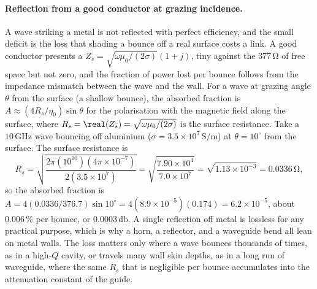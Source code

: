\paragraph{Reflection from a good conductor at grazing incidence.}
A wave striking a metal is not reflected with perfect efficiency, and the
small deficit is the loss that shading a bounce off a real surface costs a
link. A good conductor presents a  $Z_s =
\sqrt{\omega\mu_0/(2\sigma)}(1 + j)$, tiny against the $377\,\si{\ohm}$ of
free space but not zero, and the fraction of power lost per bounce follows
from the impedance mismatch between the wave and the wall. For a wave at
grazing angle $\theta$ from the surface (a shallow bounce), the absorbed
fraction is $A\approx (4 R_s/\eta_0)\sin\theta$ for the polarisation with
the magnetic field along the surface, where $R_s = \real(Z_s) =
\sqrt{\omega\mu_0/(2\sigma)}$ is the surface resistance. Take a
$10\,\si{\giga\hertz}$ wave bouncing off aluminium ($\sigma = 3.5\times
10^{7}\,\si{\siemens\per\meter}$) at $\theta = 10^{\circ}$ from the
surface. The surface resistance is
\[
R_s = \sqrt{\frac{2\pi(10^{10})(4\pi\times 10^{-7})}{2(3.5\times 10^{7})}}
= \sqrt{\frac{7.90\times 10^{4}}{7.0\times 10^{7}}} = \sqrt{1.13\times
10^{-3}} = 0.0336\,\si{\ohm},
\]
so the absorbed fraction is $A = 4(0.0336/376.7)\sin 10^{\circ} =
4(8.9\times 10^{-5})(0.174) = 6.2\times 10^{-5}$, about $0.006\,\%$ per
bounce, or $0.0003\,\si{\decibel}$. A single reflection off metal is
lossless for any practical purpose, which is why a horn, a reflector, and a
waveguide bend all lean on metal walls. The loss matters only where a wave
bounces thousands of times, as in a high-$Q$ cavity, or travels many wall
skin depths, as in a long run of waveguide, where the same $R_s$ that is
negligible per bounce accumulates into the attenuation constant of the
guide.

